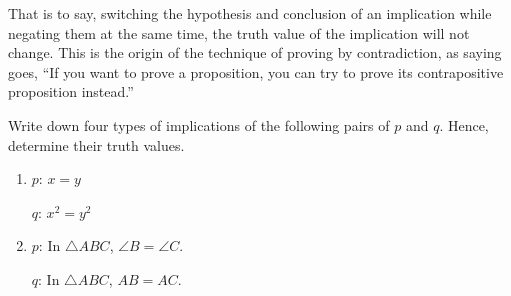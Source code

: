 \documentclass{report}
\newcounter{example}
\begin{document}
\begin{center}
\end{center}
That is to say, switching the hypothesis and conclusion of an implication while negating them at the same time, the truth value of the implication will not change. This is the origin of the technique of proving by contradiction, as saying goes, ``If you want to prove a proposition, you can try to prove its contrapositive proposition instead.''
\vspace{0.5cm}
\begin{example}
    \item Write down four types of implications of the following pairs of $p$ and $q$.
    Hence, determine their truth values.
    \begin{enumerate}[label=(\alph*), leftmargin=*]
        \item $p$: $x = y$

              $q$: $x^2 = y^2$

        \item $p$: In $\triangle ABC$, $\angle B = \angle C$.

              $q$: In $\triangle ABC$, $AB = AC$.
    \end{enumerate}
\end{example}
\end{document}
